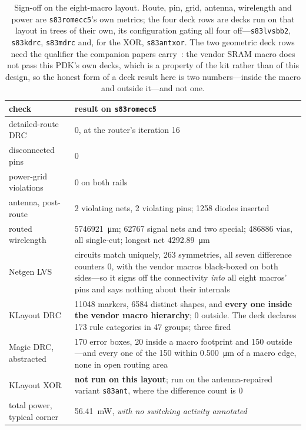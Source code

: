 \documentclass[11pt,a4paper]{article}
\newcommand{\file}[1]{\texttt{\small #1}}
\begin{document}
\begin{table}[t]
\centering
\small
\begin{tabular}{L{4.3cm}L{9.9cm}}
\toprule
check & result on \file{s83romecc5} \\
\midrule
detailed-route DRC & \num{0}, at the router's iteration \num{16} \\
disconnected pins & \num{0} \\
power-grid violations & \num{0} on both rails \\
antenna, post-route & \num{2} violating nets, \num{2} violating pins;
  \num{1258} diodes inserted \\
routed wirelength & \SI{5746921}{\um}; \num{62767} signal nets
  and two special; \num{486886} vias, all single-cut; longest net
  \SI{4292.89}{\um} \\
Netgen LVS & circuits match uniquely, \num{263} symmetries, all seven
  difference counters \num{0}, with the vendor macros black-boxed on
  both sides---so it signs off the connectivity \emph{into} all eight
  macros' pins and says nothing about their internals \\
KLayout DRC & \num{11048} markers, \num{6584} distinct shapes, and
  \textbf{every one inside the vendor macro hierarchy}; \num{0}
  outside. The deck declares \num{173} rule categories in \num{47}
  groups; three fired \\
Magic DRC, abstracted & \num{170} error boxes, \num{20} inside a macro
  footprint and \num{150} outside---and every one of the \num{150}
  within \SI{0.500}{\um} of a macro edge, none in open routing
  area \\
KLayout XOR & \textbf{not run on this layout}; run on the
  antenna-repaired variant \file{s83ant}, where the difference count is
  \num{0} \\
total power, typical corner & \SI{56.41}{\milli\watt}, \emph{with no
  switching activity annotated} \\
\bottomrule
\end{tabular}
\caption{Sign-off on the eight-macro layout. Route, pin, grid, antenna,
wirelength and power are \file{s83romecc5}'s own metrics; the four deck
rows are decks run on that layout in trees of their own, its
configuration gating all four off---\file{s83lvsbb2}, \file{s83kdrc},
\file{s83mdrc} and, for the XOR, \file{s83antxor}. The two geometric
deck rows need the qualifier the companion
papers carry~\cite{companion_decks}: the vendor SRAM macro does not pass this
PDK's own decks, which is a property of the kit rather than of this
design, so the honest form of a deck result here is two
numbers---inside the macro and outside it---and not one.}
\label{tab:signoff}
\end{table}
\end{document}
